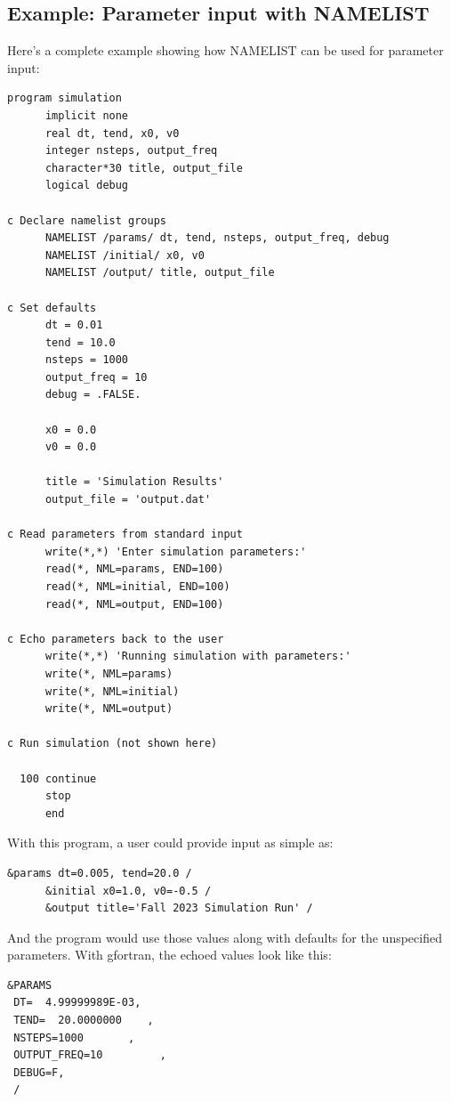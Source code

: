 \subsection{Example: Parameter input with NAMELIST}

Here's a complete example showing how NAMELIST can be used for parameter input:

\begin{lstlisting}[style=fortran77]
      program simulation
      implicit none
      real dt, tend, x0, v0
      integer nsteps, output_freq
      character*30 title, output_file
      logical debug
      
c Declare namelist groups
      NAMELIST /params/ dt, tend, nsteps, output_freq, debug
      NAMELIST /initial/ x0, v0
      NAMELIST /output/ title, output_file
      
c Set defaults
      dt = 0.01
      tend = 10.0
      nsteps = 1000
      output_freq = 10
      debug = .FALSE.
      
      x0 = 0.0
      v0 = 0.0
      
      title = 'Simulation Results'
      output_file = 'output.dat'
      
c Read parameters from standard input
      write(*,*) 'Enter simulation parameters:'
      read(*, NML=params, END=100)
      read(*, NML=initial, END=100)
      read(*, NML=output, END=100)
      
c Echo parameters back to the user
      write(*,*) 'Running simulation with parameters:'
      write(*, NML=params)
      write(*, NML=initial)
      write(*, NML=output)
      
c Run simulation (not shown here)
      
  100 continue
      stop
      end
\end{lstlisting}

With this program, a user could provide input as simple as:

\begin{lstlisting}[style=fortran77]
      &params dt=0.005, tend=20.0 /
      &initial x0=1.0, v0=-0.5 /
      &output title='Fall 2023 Simulation Run' /
\end{lstlisting}

And the program would use those values along with defaults for the unspecified parameters. With gfortran, the echoed values look like this:

\begin{lstlisting}[style=output]
&PARAMS
 DT=  4.99999989E-03,
 TEND=  20.0000000    ,
 NSTEPS=1000       ,
 OUTPUT_FREQ=10         ,
 DEBUG=F,
 /
\end{lstlisting}

